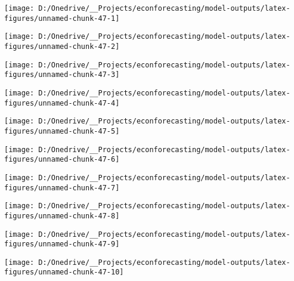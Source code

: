 \documentclass[11pt, letterpaper]{article}\usepackage[]{graphicx}\usepackage[]{color}
\begin{document}
{\centering \texttt{[image: D:/Onedrive/\_\_Projects/econforecasting/model-outputs/latex-figures/unnamed-chunk-47-1]} 

}




{\centering \texttt{[image: D:/Onedrive/\_\_Projects/econforecasting/model-outputs/latex-figures/unnamed-chunk-47-2]} 

}




{\centering \texttt{[image: D:/Onedrive/\_\_Projects/econforecasting/model-outputs/latex-figures/unnamed-chunk-47-3]} 

}




{\centering \texttt{[image: D:/Onedrive/\_\_Projects/econforecasting/model-outputs/latex-figures/unnamed-chunk-47-4]} 

}




{\centering \texttt{[image: D:/Onedrive/\_\_Projects/econforecasting/model-outputs/latex-figures/unnamed-chunk-47-5]} 

}




{\centering \texttt{[image: D:/Onedrive/\_\_Projects/econforecasting/model-outputs/latex-figures/unnamed-chunk-47-6]} 

}




{\centering \texttt{[image: D:/Onedrive/\_\_Projects/econforecasting/model-outputs/latex-figures/unnamed-chunk-47-7]} 

}




{\centering \texttt{[image: D:/Onedrive/\_\_Projects/econforecasting/model-outputs/latex-figures/unnamed-chunk-47-8]} 

}




{\centering \texttt{[image: D:/Onedrive/\_\_Projects/econforecasting/model-outputs/latex-figures/unnamed-chunk-47-9]} 

}




{\centering \texttt{[image: D:/Onedrive/\_\_Projects/econforecasting/model-outputs/latex-figures/unnamed-chunk-47-10]} 

}
\end{document}
